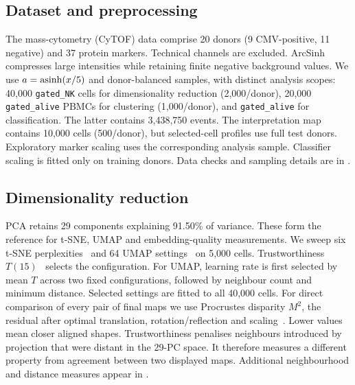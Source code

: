 \documentclass[11pt,a4paper]{article}
\begin{document}
\subsection{Dataset and preprocessing}
The mass-cytometry (CyTOF) data comprise 20 donors (9 CMV-positive, 11 negative) and 37 protein markers. Technical channels are excluded. ArcSinh compresses large intensities while retaining finite negative background values. We use $a=\operatorname{asinh}(x/5)$ and donor-balanced samples, with distinct analysis scopes: 40,000 \texttt{gated\_NK} cells for dimensionality reduction (2,000/donor), 20,000 \texttt{gated\_alive} PBMCs for clustering (1,000/donor), and \texttt{gated\_alive} for classification. The latter contains 3,438,750 events. The interpretation map contains 10,000 cells (500/donor), but selected-cell profiles use full test donors. Exploratory marker scaling uses the corresponding analysis sample. Classifier scaling is fitted only on training donors. Data checks and sampling details are in .

\subsection{Dimensionality reduction}
PCA retains 29 components explaining 91.50\% of variance. These form the reference for t-SNE, UMAP and embedding-quality measurements. We sweep six t-SNE perplexities~\cite{tsne} and 64 UMAP settings~\cite{umap} on 5,000 cells. Trustworthiness $T(15)$~\cite{trust} selects the configuration. For UMAP, learning rate is first selected by mean $T$ across two fixed configurations, followed by neighbour count and minimum distance. Selected settings are fitted to all 40,000 cells. For direct comparison of every pair of final maps we use Procrustes disparity $M^2$, the residual after optimal translation, rotation/reflection and scaling~\cite{scipy}. Lower values mean closer aligned shapes. Trustworthiness penalises neighbours introduced by projection that were distant in the 29-PC space. It therefore measures a different property from agreement between two displayed maps. Additional neighbourhood and distance measures appear in .
\end{document}
